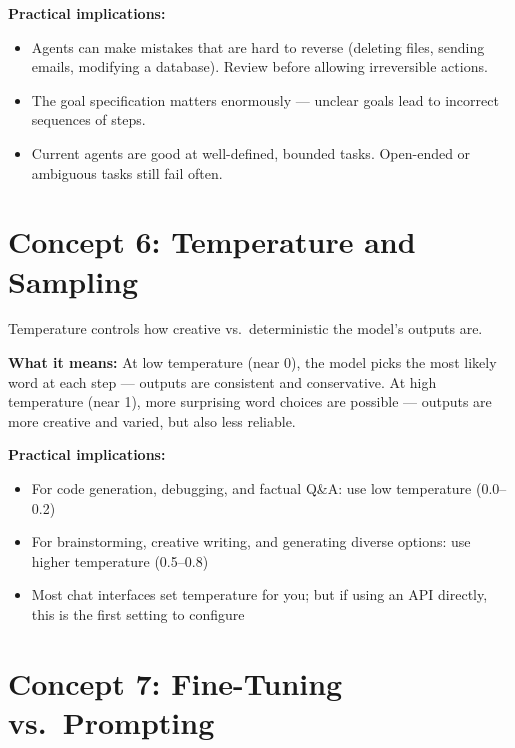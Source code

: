 \textbf{Practical implications:}
\begin{itemize}
  \item Agents can make mistakes that are hard to reverse (deleting files, sending
        emails, modifying a database). Review before allowing irreversible actions.
  \item The goal specification matters enormously --- unclear goals lead to
        incorrect sequences of steps.
  \item Current agents are good at well-defined, bounded tasks.
        Open-ended or ambiguous tasks still fail often.
\end{itemize}

\section{Concept 6: Temperature and Sampling}
\label{sec:temperature}

\begin{conceptbox}
Temperature controls how creative vs.\ deterministic the model's outputs are.
\end{conceptbox}

\textbf{What it means:}
At low temperature (near 0), the model picks the most likely word at each step ---
outputs are consistent and conservative.
At high temperature (near 1), more surprising word choices are possible --- outputs
are more creative and varied, but also less reliable.

\textbf{Practical implications:}
\begin{itemize}
  \item For code generation, debugging, and factual Q\&A: use low temperature (0.0--0.2)
  \item For brainstorming, creative writing, and generating diverse options: use higher
        temperature (0.5--0.8)
  \item Most chat interfaces set temperature for you; but if using an API directly,
        this is the first setting to configure
\end{itemize}

\section{Concept 7: Fine-Tuning vs.\ Prompting}
\label{sec:finetuning}

